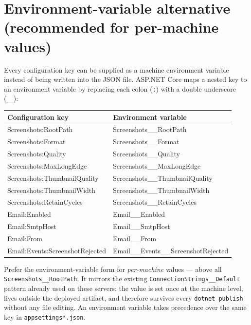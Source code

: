 \documentclass[12pt,a4paper]{report}
\begin{document}
\section{Environment-variable alternative (recommended for per-machine values)}

Every configuration key can be supplied as a machine environment variable instead of being written
into the JSON file. ASP.NET Core maps a nested key to an environment variable by replacing each
colon (\texttt{:}) with a double underscore (\texttt{\_\_}):

\begin{longtable}{>{\ttfamily}p{6.6cm} >{\ttfamily}p{7.4cm}}
\toprule
\normalfont\textbf{Configuration key} & \normalfont\textbf{Environment variable} \\
\midrule
\endhead
Screenshots:RootPath          & Screenshots\_\_RootPath \\
Screenshots:Format            & Screenshots\_\_Format \\
Screenshots:Quality           & Screenshots\_\_Quality \\
Screenshots:MaxLongEdge       & Screenshots\_\_MaxLongEdge \\
Screenshots:ThumbnailQuality  & Screenshots\_\_ThumbnailQuality \\
Screenshots:ThumbnailWidth    & Screenshots\_\_ThumbnailWidth \\
Screenshots:RetainCycles      & Screenshots\_\_RetainCycles \\
Email:Enabled                 & Email\_\_Enabled \\
Email:SmtpHost                & Email\_\_SmtpHost \\
Email:From                    & Email\_\_From \\
Email:Events:ScreenshotRejected & Email\_\_Events\_\_ScreenshotRejected \\
\bottomrule
\end{longtable}

\begin{notebox}
Prefer the environment-variable form for \emph{per-machine} values --- above all
\texttt{Screenshots\_\_RootPath}. It mirrors the existing \texttt{ConnectionStrings\_\_Default}
pattern already used on these servers: the value is set once at the machine level, lives outside the
deployed artifact, and therefore survives every \texttt{dotnet publish} without any file editing. An
environment variable takes precedence over the same key in \texttt{appsettings*.json}.
\end{notebox}
\end{document}
